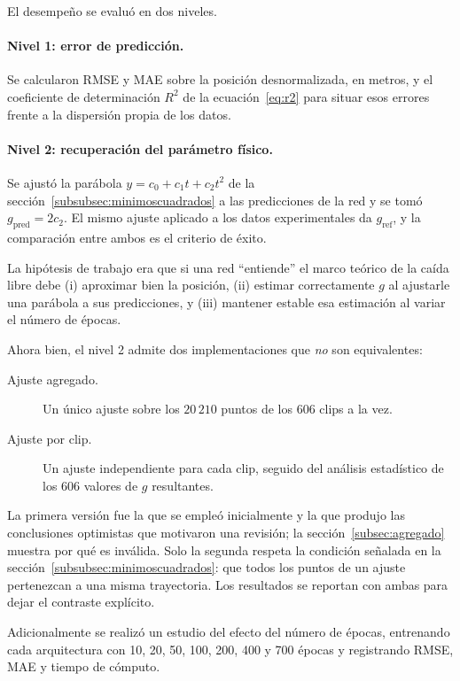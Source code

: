 \documentclass[titlepage,11pt]{article}
\providecommand{\num}[1]{\ensuremath{#1}}
\begin{document}
El desempeño se evaluó en dos niveles.

\paragraph{Nivel 1: error de predicción.} Se calcularon RMSE y MAE sobre la
posición desnormalizada, en metros, y el coeficiente de determinación
$R^2$ de la ecuación~\eqref{eq:r2} para situar esos errores frente a la
dispersión propia de los datos.

\paragraph{Nivel 2: recuperación del parámetro físico.} Se ajustó la parábola
$y=c_0+c_1t+c_2t^2$ de la sección~\ref{subsubsec:minimoscuadrados} a las
predicciones de la red y se tomó $g_{\text{pred}}=2c_2$. El mismo ajuste
aplicado a los datos experimentales da $g_{\text{ref}}$, y la comparación entre
ambos es el criterio de éxito.

La hipótesis de trabajo era que si una red \enquote{entiende} el marco teórico
de la caída libre debe (i) aproximar bien la posición, (ii) estimar
correctamente $g$ al ajustarle una parábola a sus predicciones, y (iii)
mantener estable esa estimación al variar el número de épocas.

Ahora bien, el nivel 2 admite dos implementaciones que \emph{no} son
equivalentes:

\begin{description}
\item[Ajuste agregado.] Un único ajuste sobre los \num{20\,210} puntos de los 606
  clips a la vez.
\item[Ajuste por clip.] Un ajuste independiente para cada clip, seguido del
  análisis estadístico de los 606 valores de $g$ resultantes.
\end{description}

La primera versión fue la que se empleó inicialmente y la que produjo las
conclusiones optimistas que motivaron una revisión;
la sección~\ref{subsec:agregado} muestra por qué es inválida. Solo la segunda
respeta la condición señalada en la sección~\ref{subsubsec:minimoscuadrados}:
que todos los puntos de un ajuste pertenezcan a una misma trayectoria. Los
resultados se reportan con ambas para dejar el contraste explícito.

Adicionalmente se realizó un estudio del efecto del número de épocas,
entrenando cada arquitectura con 10, 20, 50, 100, 200, 400 y 700 épocas y
registrando RMSE, MAE y tiempo de cómputo.
\end{document}
